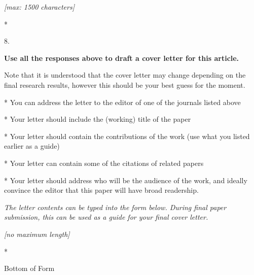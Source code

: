 \documentclass[]{article}
\begin{document}
\emph{{[}max: 1500 characters{]}}

*

8.

\textbf{Use all the responses above to draft a cover letter for this
article.}

Note that it is understood that the cover letter may change depending on
the final research results, however this should be your best guess for
the moment.

* You can address the letter to the editor of one of the journals listed
above

* Your letter should include the (working) title of the paper

* Your letter should contain the contributions of the work (use what you
listed earlier as a guide)

* Your letter can contain some of the citations of related papers

* Your letter should address who will be the audience of the work, and
ideally convince the editor that this paper will have broad readership.

\emph{The letter contents can be typed into the form below. During final
paper submission, this can be used as a guide for your final cover
letter.}

\emph{{[}no maximum length{]}}

*

Bottom of Form
\end{document}
